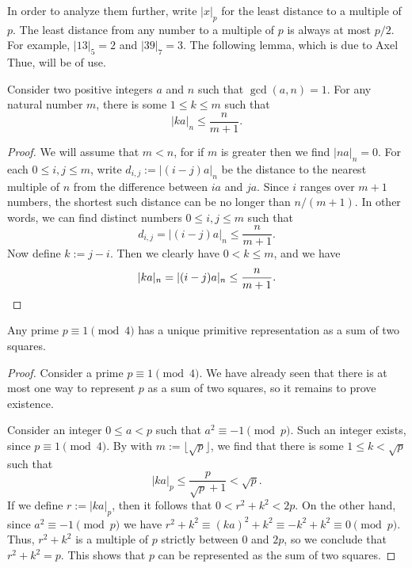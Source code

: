 In order to analyze them further, write $|x|_p$ for the least distance to a multiple of $p$. The least distance from any number to a multiple of $p$ is always at most $p/2$. For example, $|13|_5=2$ and $|39|_7=3$. The following lemma, which is due to Axel Thue, will be of use.

\begin{lemma}\label{lemma:thues-lemma}
  Consider two positive integers $a$ and $n$ such that $\gcd(a,n)=1$. For any natural number $m$, there is some $1\leq k\leq m$ such that
  \begin{equation*}
    |ka|_n\leq\frac{n}{m+1}.
  \end{equation*}
\end{lemma}

\begin{proof}
  We will assume that $m<n$, for if $m$ is greater then we find $|na|_n=0$. For each $0\leq i,j\leq m$, write $d_{i,j}:=|(i-j)a|_n$ be the distance to the nearest multiple of $n$ from the difference between $ia$ and $ja$. Since $i$ ranges over $m+1$ numbers, the shortest such distance can be no longer than $n/(m+1)$. In other words, we can find distinct numbers $0\leq i,j\leq m$ such that
  \begin{equation*}
    d_{i,j}=|(i-j)a|_n\leq \frac{n}{m+1}.
  \end{equation*}
  Now define $k:=j-i$. Then we clearly have $0<k\leq m$, and we have
  \begin{equation*}
    |ka|_n=|(i-j)a|_n\leq \frac{n}{m+1}.\qedhere
  \end{equation*}
\end{proof}

\begin{theorem}\label{theorem:two-squares-primes}
  Any prime $p\equiv 1\pmod{4}$ has a unique primitive representation as a sum of two squares.
\end{theorem}

\begin{proof}
  Consider a prime $p\equiv 1\pmod{4}$. We have already seen that there is at most one way to represent $p$ as a sum of two squares, so it remains to prove existence.

  Consider an integer $0\leq a<p$ such that $a^2\equiv -1\pmod{p}$. Such an integer exists, since $p\equiv 1\pmod{4}$. By  with $m:=\lfloor\sqrt{p}\rfloor$, we find that there is some $1\leq k<\sqrt{p}$ such that
  \begin{equation*}
    |ka|_p\leq \frac{p}{\sqrt{p}+1}<\sqrt{p}.
  \end{equation*}
  If we define $r:=|ka|_p$, then it follows that $0<r^2+k^2<2p$. On the other hand, since $a^2\equiv-1\pmod{p}$ we have $r^2+k^2\equiv (ka)^2+k^2\equiv -k^2+k^2\equiv 0\pmod{p}$. Thus, $r^2+k^2$ is a multiple of $p$ strictly between $0$ and $2p$, so we conclude that $r^2+k^2=p$. This shows that $p$ can be represented as the sum of two squares.
\end{proof}

